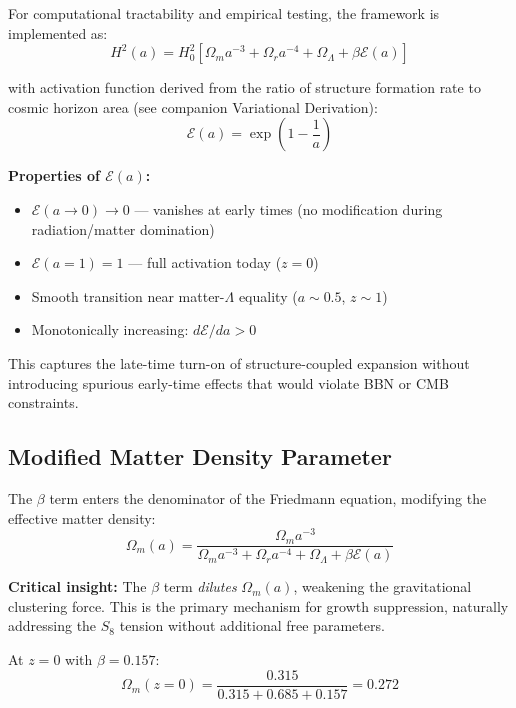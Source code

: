 \documentclass[twocolumn,superscriptaddress,prl,amsmath,amssymb]{revtex4-2}
\begin{document}
For computational tractability and empirical testing, the framework is implemented as:
\begin{equation}
H^2(a) = H_0^2[\Omega_m a^{-3} + \Omega_r a^{-4} + \Omega_\Lambda + \beta \mathcal{E}(a)]
\label{eq:H_eff}
\end{equation}

with activation function derived from the ratio of structure formation rate to cosmic horizon area (see companion Variational Derivation):
\begin{equation}
\mathcal{E}(a) = \exp\left(1 - \frac{1}{a}\right)
\label{eq:activation}
\end{equation}

\textbf{Properties of $\mathcal{E}(a)$:}
\begin{itemize}
\item $\mathcal{E}(a \to 0) \to 0$ --- vanishes at early times (no modification during radiation/matter domination)
\item $\mathcal{E}(a = 1) = 1$ --- full activation today ($z=0$)
\item Smooth transition near matter-$\Lambda$ equality ($a \sim 0.5$, $z \sim 1$)
\item Monotonically increasing: $d\mathcal{E}/da > 0$
\end{itemize}

This captures the late-time turn-on of structure-coupled expansion without introducing spurious early-time effects that would violate BBN or CMB constraints.

\subsection{Modified Matter Density Parameter}

The $\beta$ term enters the denominator of the Friedmann equation, modifying the effective matter density:
\begin{equation}
\Omega_m(a) = \frac{\Omega_m a^{-3}}{\Omega_m a^{-3} + \Omega_r a^{-4} + \Omega_\Lambda + \beta \mathcal{E}(a)}
\label{eq:Omega_m_modified}
\end{equation}

\textbf{Critical insight:} The $\beta$ term \textit{dilutes} $\Omega_m(a)$, weakening the gravitational clustering force. This is the primary mechanism for growth suppression, naturally addressing the $S_8$ tension without additional free parameters.

At $z=0$ with $\beta = 0.157$:
\begin{equation}
\Omega_m(z=0) = \frac{0.315}{0.315 + 0.685 + 0.157} = 0.272
\end{equation}
\end{document}
